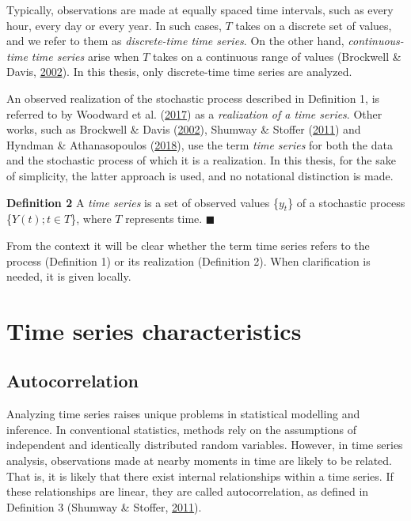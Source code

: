\documentclass[12pt,oneside]{reedthesis}
\begin{document}
Typically, observations are made at equally spaced time intervals, such
as every hour, every day or every year. In such cases, \(T\) takes on a
discrete set of values, and we refer to them as \emph{discrete-time time
series}. On the other hand, \emph{continuous-time time series} arise
when \(T\) takes on a continuous range of values (Brockwell \& Davis,
\protect\hyperlink{ref-brockwell2002}{2002}). In this thesis, only
discrete-time time series are analyzed.

An observed realization of the stochastic process described in
Definition 1, is referred to by Woodward et al.
(\protect\hyperlink{ref-woodward2017}{2017}) as a \emph{realization of a
time series}. Other works, such as Brockwell \& Davis
(\protect\hyperlink{ref-brockwell2002}{2002}), Shumway \& Stoffer
(\protect\hyperlink{ref-shumway2011}{2011}) and Hyndman \&
Athanasopoulos (\protect\hyperlink{ref-hyndman2018fpp}{2018}), use the
term \emph{time series} for both the data and the stochastic process of
which it is a realization. In this thesis, for the sake of simplicity,
the latter approach is used, and no notational distinction is made.

\textbf{Definition 2} A \emph{time series} is a set of observed values
\{\(y_{t}\)\} of a stochastic process \{\(Y(t); t \in T\)\}, where \(T\)
represents time. \(\blacksquare\)

From the context it will be clear whether the term time series refers to
the process (Definition 1) or its realization (Definition 2). When
clarification is needed, it is given locally.

\section{Time series characteristics}\label{time-series-characteristics}

\subsection{Autocorrelation}\label{autocorrelation}

Analyzing time series raises unique problems in statistical modelling
and inference. In conventional statistics, methods rely on the
assumptions of independent and identically distributed random variables.
However, in time series analysis, observations made at nearby moments in
time are likely to be related. That is, it is likely that there exist
internal relationships within a time series. If these relationships are
linear, they are called autocorrelation, as defined in Definition 3
(Shumway \& Stoffer, \protect\hyperlink{ref-shumway2011}{2011}).
\end{document}
